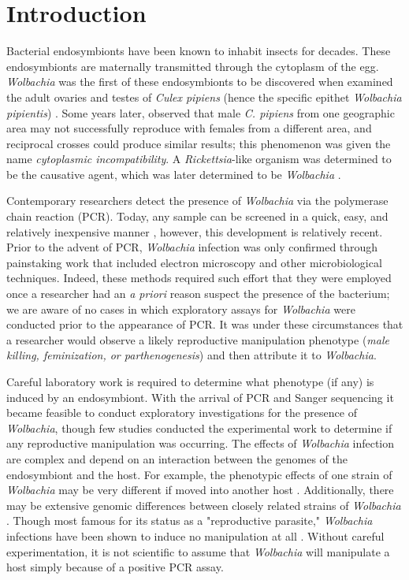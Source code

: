 \documentclass{frontiersSCNS} %
\begin{document}
\section{Introduction}

Bacterial endosymbionts have been known to inhabit insects for decades. These endosymbionts are maternally transmitted through the cytoplasm of the egg. \textit{Wolbachia} was the first of these endosymbionts to be discovered when \citet{Hertig:1924wy} examined the adult ovaries and testes of \textit{Culex pipiens} (hence the specific epithet \textit{Wolbachia pipientis}) \citet{Hertig:1936}. Some years later, \citet{Yen:1971tc} observed that male \textit{C. pipiens} from one geographic area may not successfully reproduce with females from a different area, and reciprocal crosses could produce similar results; this phenomenon was given the name \textit{cytoplasmic incompatibility}. A \textit{Rickettsia}-like organism was determined to be the causative agent, which was later determined to be \textit{Wolbachia} \citep{Yen:1973vx}.

Contemporary researchers detect the presence of \textit{Wolbachia} via the polymerase chain reaction (PCR). Today, any sample can be screened in a quick, easy, and relatively inexpensive manner \citep{Baldo:2006p7025,Simoes:2011p11073}, however, this development is relatively recent. Prior to the advent of PCR, \textit{Wolbachia} infection was only confirmed through painstaking work that included electron microscopy and other microbiological techniques. Indeed, these methods required such effort that they were employed once a researcher had an \textit{a priori} reason suspect the presence of the bacterium; we are aware of no cases in which exploratory assays for \textit{Wolbachia} were conducted prior to the appearance of PCR. It was under these circumstances that a researcher would observe a likely reproductive manipulation phenotype (\emph{male killing, feminization, \emph{or} parthenogenesis}) and then attribute it to \textit{Wolbachia}.

Careful laboratory work is required to determine what phenotype (if any) is induced by an endosymbiont. With the arrival of PCR and Sanger sequencing it became feasible to conduct exploratory investigations for the presence of \textit{Wolbachia}, though few studies conducted the experimental work to determine if any reproductive manipulation was occurring. The effects of \textit{Wolbachia} infection are complex and depend on an interaction between the genomes of the endosymbiont and the host. For example, the phenotypic effects of one strain of \textit{Wolbachia} may be very different if moved into another host \citep{Rigaud:2001fv,Hoffmann:2011p11474}. Additionally, there may be extensive genomic differences between closely related strains of \textit{Wolbachia} \citep{Ishmael:2009p8257}. Though most famous for its status as a "reproductive parasite," \textit{Wolbachia} infections have been shown to induce no manipulation at all \citep{Hamm:2014cv,Zhang:2010jl,Zhang:2013eo}. Without careful experimentation, it is not scientific to assume that \textit{Wolbachia} will manipulate a host simply because of a positive PCR assay. 
\end{document}

